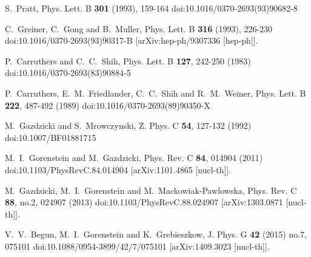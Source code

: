 \begin{thebibliography}{99}
S.~Pratt,
Phys. Lett. B \textbf{301} (1993), 159-164
doi:10.1016/0370-2693(93)90682-8

C.~Greiner, C.~Gong and B.~Muller,
Phys. Lett. B \textbf{316} (1993), 226-230
doi:10.1016/0370-2693(93)90317-B
[arXiv:hep-ph/9307336 [hep-ph]].

P.~Carruthers and C.~C.~Shih,
Phys. Lett. B \textbf{127}, 242-250 (1983)
doi:10.1016/0370-2693(83)90884-5

P.~Carruthers, E.~M.~Friedlander, C.~C.~Shih and R.~M.~Weiner,
Phys. Lett. B \textbf{222}, 487-492 (1989)
doi:10.1016/0370-2693(89)90350-X

M.~Gazdzicki and S.~Mrowczynski,
Z. Phys. C \textbf{54}, 127-132 (1992)
doi:10.1007/BF01881715

M.~I.~Gorenstein and M.~Gazdzicki,
Phys. Rev. C \textbf{84}, 014904 (2011)
doi:10.1103/PhysRevC.84.014904
[arXiv:1101.4865 [nucl-th]].

M.~Gazdzicki, M.~I.~Gorenstein and M.~Mackowiak-Pawlowska,
Phys. Rev. C \textbf{88}, no.2, 024907 (2013)
doi:10.1103/PhysRevC.88.024907
[arXiv:1303.0871 [nucl-th]].


V.~V.~Begun, M.~I.~Gorenstein and K.~Grebieszkow,
J. Phys. G \textbf{42} (2015) no.7, 075101
doi:10.1088/0954-3899/42/7/075101
[arXiv:1409.3023 [nucl-th]].


\end{thebibliography}
